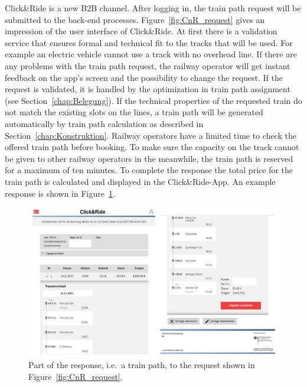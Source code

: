 Click\&Ride is a new B2B channel. After logging in, the train path request will be submitted to the back-end processes. Figure~\ref{fig:CnR_request} gives an impression of the user interface of Click\&Ride.
At first there is a validation service that ensures formal and technical fit to the tracks that will be used. For example an electric vehicle cannot use a track with no overhead line. If there are any problems with the train path request, the railway operator will get instant feedback on the app's screen and the possibility to change the request. If the request is validated, it is handled by the optimization in train path assignment (see Section~\ref{chap:Belegung}). If the technical properties of the requested train do not match the existing slots on the lines, a train path will be generated automatically by train path calculation as described in Section~\ref{chap:Konstruktion}. Railway operators have a limited time to check the offered train path before booking. To make sure the capacity on the track cannot be given to other railway operators in the meanwhile, the train path is reserved for a maximum of ten minutes. To complete the response the total price for the train path is calculated and displayed in the Click\&Ride-App. An example response is shown in Figure~\ref{fig:CnR_response}.
\begin{figure}[htb]
	\centering
	\includegraphics[width=\textwidth]{Bilder/response.jpg}
	\caption{Part of the response, i.e.\ a train path, to the request shown in Figure~\ref{fig:CnR_request}.}
	\label{fig:CnR_response}
\end{figure}

